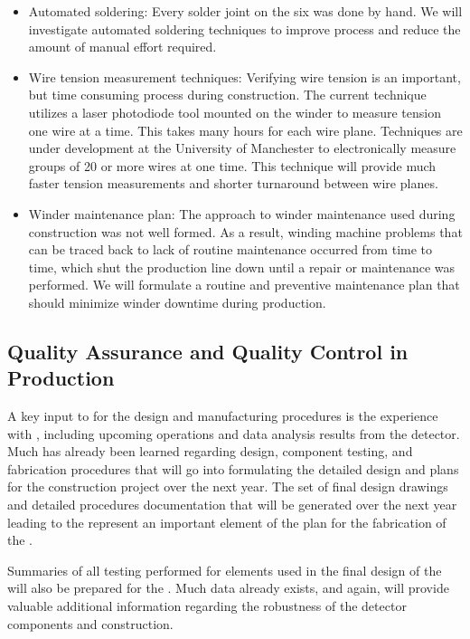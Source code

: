 \begin{itemize}
\item Automated soldering: Every solder joint on the six   was done by hand. We will investigate automated soldering techniques to improve process and reduce the amount of manual effort required. 

\item Wire tension measurement techniques: Verifying wire tension is an important, but time consuming process during construction. The current technique utilizes a laser photodiode tool mounted on the winder to measure tension one wire at a time. This takes many hours for each wire plane. Techniques are under development at the University of Manchester to electronically measure groups of \num{20} or more wires at one time. This technique will provide much faster tension measurements and shorter turnaround between wire planes. 

\item Winder maintenance plan: The approach to winder maintenance used during  construction was not well formed. As a result, winding machine problems that can be traced back to lack of routine maintenance occurred from time to time, which shut the production line down until a repair or maintenance was performed. We will formulate a routine and preventive maintenance plan that should minimize winder downtime during  production.
\end{itemize}


\subsection{Quality Assurance and Quality Control in  Production}
\label{sec:fdsp-apa-qa}

A key input to  for the  design and manufacturing procedures is the experience with , including upcoming operations and data analysis results from the detector.  Much has already been learned regarding design, component testing, and fabrication procedures that will go into formulating the detailed design and plans for the %
 construction project over the next year.  The set of final design drawings and detailed procedures documentation that will be generated over the next year leading to the  represent an important element of the  plan for the fabrication of the .  

Summaries of all  testing performed for elements used in the final design of the  will also be prepared for the .  Much data already exists, and again,  will provide valuable additional information regarding the robustness of the detector components and construction.  

